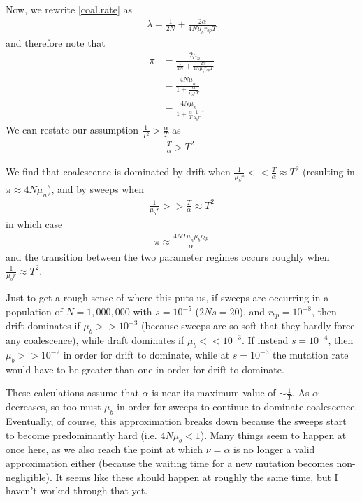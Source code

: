 \documentclass[reqno]{amsart}
\begin{document}
Now, we rewrite \eqref{coal.rate} as 
\begin{align}
	\lambda = \frac{1}{2N} + \frac{2\alpha}{4N\mu_br_{bp}T}
\end{align}
and therefore note that
\begin{align}
	\pi &= \frac{2\mu_n}{\frac{1}{2N} + \frac{2\alpha}{4N\mu_br_{bp}T}}\\
	&= \frac{4N\mu_n}{1 + \frac{\alpha}{\mu_b r T}}\\
	&= \frac{4N\mu_n}{1 + \frac{\alpha}{T}\frac{1}{\mu_b r}}.
\end{align}
We can restate our assumption $\frac{1}{T^2} > \frac{\alpha}{T}$ as
\begin{align}
	\frac{T}{\alpha} > T^2.
\end{align}

We find that coalescence is dominated by drift when $\frac{1}{\mu_b r} << \frac{T}{\alpha} \approx T^2$ (resulting in $\pi \approx 4N\mu_n$), and by sweeps when
\begin{align}
	\frac{1}{\mu_b r} >> \frac{T}{\alpha} \approx T^2
\end{align}
in which case 
\begin{align}
	\pi \approx \frac{4NT\mu_n\mu_b r_{bp}}{\alpha}
\end{align}
and the transition between the two parameter regimes occurs roughly when $\frac{1}{\mu_b r} \approx T^2$. 

Just to get a rough sense of where this puts us, if sweeps are occurring in a population of $N = 1,000,000$ with $s=10^{-5}$ ($2Ns = 20$), and $r_{bp} = 10^{-8}$, then drift dominates if $\mu_{b}>>10^{-3}$ (because sweeps are so soft that they hardly force any coalescence), while draft dominates if $\mu_b<<10^{-3}$. If instead $s=10^{-4}$, then $\mu_b>>10^{-2}$ in order for drift to dominate, while at $s=10^{-3}$ the mutation rate would have to be greater than one in order for drift to dominate. 

These calculations assume that $\alpha$ is near its maximum value of $\sim\frac{1}{T}$. As $\alpha$ decreases, so too must $\mu_b$ in order for sweeps to continue to dominate coalescence. Eventually, of course, this approximation breaks down because the sweeps start to become predominantly hard (i.e. $4N\mu_b < 1$). Many things seem to happen at once here, as we also reach the point at which $\nu = \alpha$ is no longer a valid approximation either (because the waiting time for a new mutation becomes non-negligible). It seems like these should happen at roughly the same time, but I haven't worked through that yet.
\end{document}
